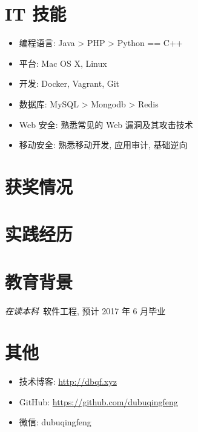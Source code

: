 \documentclass{resume}
\begin{document}
\section{IT 技能}
\begin{onehalfspacing}
\begin{itemize}[parsep=0.5ex]
  \item 编程语言: Java > PHP > Python == C++
  \item 平台: Mac OS X, Linux
  \item 开发: Docker, Vagrant, Git
  \item 数据库: MySQL > Mongodb > Redis
  \item Web 安全: 熟悉常见的 Web 漏洞及其攻击技术
  \item 移动安全: 熟悉移动开发, 应用审计, 基础逆向
\end{itemize}
\end{onehalfspacing}

\section{获奖情况}

\section{实践经历}

\section{教育背景}
\textit{在读本科}\ 软件工程, 预计 2017 年 6 月毕业

\section{其他}
\begin{itemize}[parsep=0.5ex]
  \item 技术博客: \href{http://dbqf.xyz}{http://dbqf.xyz}
  \item GitHub: \href{https://github.com/dubuqingfeng}{https://github.com/dubuqingfeng}
  \item 微信: dubuqingfeng
\end{itemize}
\end{document}
